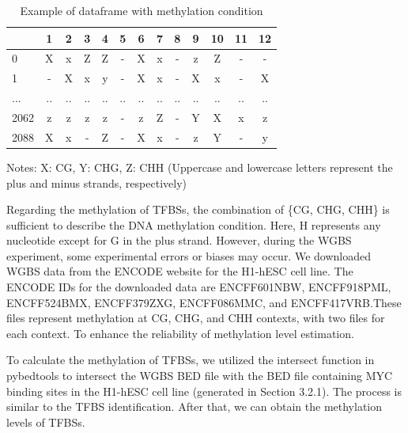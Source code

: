 \documentclass{PHlab-thesis}
\begin{document}
\begin{table}[H]
	\centering
	\begin{tabular}{l*{12}{c}}
		\toprule
		         & 1 &  2&  3&4  &5&6&7&8&  9& 10 & 11&12\\
		\midrule
	
		0     &X  &x  &Z  &Z  &-  &X  &x & -  &z  &Z  &-  &-\\
		1     &-  &X  &x  &y  &-  &X  &x  &-  &X  &x  &-  &X\\
		...   &.. &.. &.. &.. &.. &.. &.. &.. &.. &.. &.. &..\\
		2062  &z  &z  &z  &z  &-  &z  &Z  &- &Y   &X &x  &z\\
		2088  &X  &x  &-  &Z  &-  &X  &x  &-  &z  &Y  &-  &y\\
		\bottomrule

	\end{tabular}
	\begin{minipage}{9.5cm}
		\vspace{0.15cm}
		\footnotesize  Notes: X: CG, Y: CHG, Z: CHH (Uppercase and lowercase letters represent the plus and minus strands, respectively)
		\end{minipage}
	\caption{Example of dataframe with methylation condition}
	\label{table:ctx}
\end{table}

Regarding the methylation of TFBSs, the combination of \{CG, CHG, CHH\} is sufficient to describe the DNA methylation condition. Here, H represents any nucleotide except for G in the plus strand. However, during the WGBS experiment, some experimental errors or biases may occur.  We downloaded WGBS data from the ENCODE website for the H1-hESC cell line. The ENCODE IDs for the downloaded data are ENCFF601NBW, ENCFF918PML, ENCFF524BMX, ENCFF379ZXG, ENCFF086MMC, and ENCFF417VRB.\linebreak[4]
These files represent methylation at CG, CHG, and CHH contexts, with two files for each context. To enhance the reliability of methylation level estimation.

To calculate the methylation of TFBSs, we utilized the intersect function in pybedtools to intersect the WGBS BED file with the BED file containing MYC binding sites in the H1-hESC cell line (generated in Section 3.2.1). The process is similar to the TFBS identification. After that, we can obtain the methylation levels of TFBSs.
\end{document}
